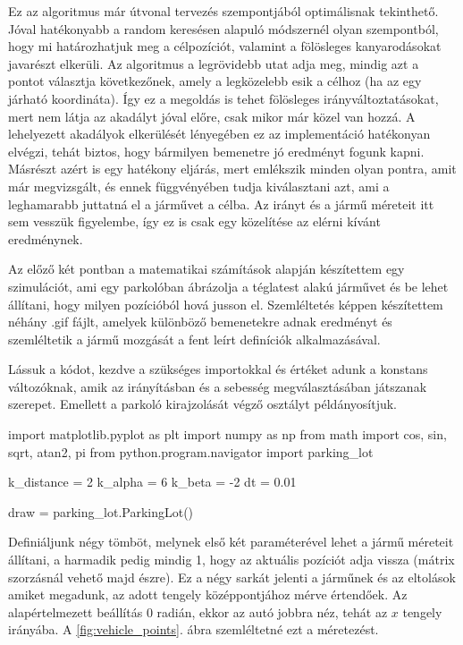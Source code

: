 Ez az algoritmus már útvonal tervezés szempontjából optimálisnak tekinthető. Jóval hatékonyabb a random keresésen alapuló módszernél olyan szempontból, hogy mi határozhatjuk meg a célpozíciót, valamint a fölösleges kanyarodásokat javarészt elkerüli. Az algoritmus a legrövidebb utat adja meg, mindig azt a pontot választja következőnek, amely a legközelebb esik a célhoz (ha az egy járható koordináta). Így ez a megoldás is tehet fölösleges irányváltoztatásokat, mert nem látja az akadályt jóval előre, csak mikor már közel van hozzá. A lehelyezett akadályok elkerülését lényegében ez az implementáció hatékonyan elvégzi, tehát biztos, hogy bármilyen bemenetre jó eredményt fogunk kapni. Másrészt azért is egy hatékony eljárás, mert emlékszik minden olyan pontra, amit már megvizsgált, és ennek függvényében tudja kiválasztani azt, ami a leghamarabb juttatná el a járművet a célba. Az irányt és a jármű méreteit itt sem vesszük figyelembe, így ez is csak egy közelítése az elérni kívánt eredménynek.


Az előző két pontban a matematikai számítások alapján készítettem egy szimulációt, ami egy parkolóban ábrázolja a téglatest alakú járművet és be lehet állítani, hogy milyen pozícióból hová jusson el. Szemléltetés képpen készítettem néhány .gif fájlt, amelyek különböző bemenetekre adnak eredményt és szemléltetik a jármű mozgását a fent leírt definíciók alkalmazásával.

Lássuk a kódot, kezdve a szükséges importokkal és értéket adunk a konstans változóknak, amik az irányításban és a sebesség megválasztásában játszanak szerepet. Emellett a parkoló kirajzolását végző osztályt példányosítjuk.
\begin{python}
import matplotlib.pyplot as plt
import numpy as np
from math import cos, sin, sqrt, atan2, pi
from python.program.navigator import parking_lot

k_distance = 2
k_alpha = 6
k_beta = -2
dt = 0.01

draw = parking_lot.ParkingLot()
\end{python}

Definiáljunk négy tömböt, melynek első két paraméterével lehet a jármű méreteit állítani, a harmadik pedig mindig 1, hogy az aktuális pozíciót adja vissza (mátrix szorzásnál vehető majd észre). Ez a négy sarkát jelenti a járműnek és az eltolások amiket megadunk, az adott tengely középpontjához mérve értendőek. Az alapértelmezett beállítás 0 radián, ekkor az autó jobbra néz, tehát az $ x $ tengely irányába. A \ref{fig:vehicle_points}. ábra szemléltetné ezt a méretezést.

